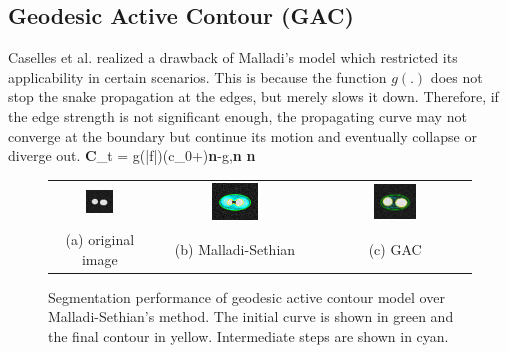 \subsection{Geodesic Active Contour (GAC)}
Caselles et al.\cite{caselles_GAC} realized a drawback of Malladi's model which restricted its applicability in certain scenarios. This is because the function $g(.)$ does not stop the snake propagation at the edges, but merely slows it down. Therefore, if the edge strength is not significant enough, the propagating curve may not converge at the boundary but continue its motion and eventually collapse or diverge out.
\bea
\textbf{C}_t = g(|\nabla f|)(c_0+\kappa)\;\textbf{n}-\langle\nabla g,\textbf{n} \rangle \;\textbf{n}
\label{eq:GAC}
\eea
\begin{figure}[t]
\centering
\renewcommand{\tabcolsep}{0.05cm}
\begin{tabular}{@{}ccc@{}}
\includegraphics[width=0.3\textwidth]{images/demo/GAC/blobs_gaussian}	&
\includegraphics[width=0.3\textwidth]{images/demo/GAC/malladi_bad}	&
\includegraphics[width=0.3\textwidth]{images/demo/GAC/GAC_good}	\\
(a) original image & (b) Malladi-Sethian  & (c) GAC
\end{tabular}
\caption[GAC vs Malladi-Sethian model]{Segmentation performance of geodesic active contour model over Malladi-Sethian's method. The initial curve is shown in green and the final contour in yellow. Intermediate steps are shown in cyan.}
\label{fig:GACvsMalladi}
\end{figure}

